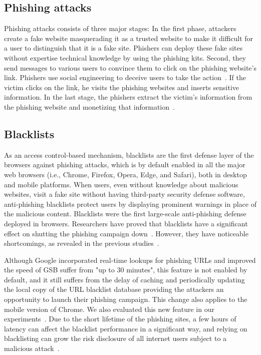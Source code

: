 \subsection{Phishing attacks}
Phishing attacks consists of three major stages: In the first phase, attackers create a fake website masquerading it as a trusted website to make it difficult for a user to distinguish that it is a fake site. Phishers can deploy these fake sites without expertise technical knowledge by using the phishing kits. Second, they send messages to various users to convince them to click on the phishing website's link. Phishers use social engineering to deceive users to take the action~\cite{dhamija2006phishing,thomas2013trafficking}. If the victim clicks on the link, he visits the phishing websites and inserts sensitive information. In the last stage, the phishers extract the victim's information from the phishing website and monetizing that information~\cite{gupta2018defending}.

\subsection{Blacklists}
As an access control-based mechanism, blacklists are the first defense layer of the browsers against phishing attacks, which is by default enabled in all the major web browsers (i.e., Chrome, Firefox, Opera, Edge, and Safari), both in desktop and mobile platforms.
When users, even without knowledge about malicious websites, visit a fake site without having third-party security defense software, anti-phishing blacklists protect users by displaying prominent warnings in place of the malicious content. Blacklists were the first large-scale anti-phishing defense deployed in browsers. 
Researchers have proved that blacklists have a significant effect on shutting the phishing campaign down~\cite{sheng2009empirical}.
However, they have noticeable shortcomings, as revealed in the previous studies~\cite{oest2020sunrise}.

Although Google incorporated real-time lookups for phishing URLs and improved the speed of GSB suffer from "up to 30 minutes", this feature is not enabled by default, and it still suffers from the delay of caching and periodically updating the local copy of the URL blacklist database providing the attackers an opportunity to launch their phishing campaign. This change also applies to the mobile version of Chrome. We also evaluated this new feature in our experiments~\cite{google-online-security-blog-2019}. Due to the short lifetime of the phishing sites, a few hours of latency can affect the blacklist performance in a significant way, and relying on blacklisting can grow the risk disclosure of all internet users subject to a malicious attack~\cite{oest2020sunrise,sheng2009empirical}.

